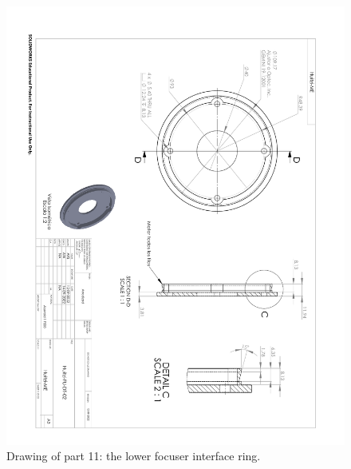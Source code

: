 \begin{figure}
\begin{center}
\includegraphics[angle=180,width=0.9\linewidth]{figures/huitzi-f20-part-11.pdf}
\end{center}
\caption{Drawing of part 11: the lower focuser interface ring.}
\label{figure:huitzi-f20-part-11}
\end{figure}

